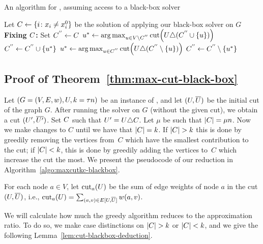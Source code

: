 \begin{algorithm}[H]
\caption{An algorithm for \maxcutkc, assuming access to a black-box \maxcut solver}
\label{algo:maxcutkc-blackbox}
\begin{algorithmic}[1]
\State Let $C \leftarrow \{i \colon x_i \neq x^0_i\}$ be the solution
	of applying our black-box \maxcut solver on $G$
\State \textbf{Fixing $C$:} Set $C^{''} \gets C$ 
        \State $u^* \leftarrow \arg\max_{u \in V \setminus \FixSelectSet} \cut{\OldSet \symm (\FixSelectSet \cup \{u\})}$
        \State $C^{''} \leftarrow C^{''} \cup \{u^*\}$
        \State $u^* \leftarrow \arg\max_{u \in \FixSelectSet} \cut{\OldSet \symm (\FixSelectSet \setminus \{u\})}$
        \State $C^{''} \leftarrow C^{''} \setminus \{u^*\}$
    \EndIf
\EndWhile
\State \Return{$\FixSelectSet$}
\end{algorithmic}
\end{algorithm}

\subsection{Proof of Theorem~\ref{thm:max-cut-black-box}}
\label{appendix:mc-proofs:blackbox}
Let $(G=(V, E, w), U, k = \tau n)$ be an instance of \maxcutkc, and let
$(U, \overline{U})$ be the initial cut of the graph $G$.
After running the \maxcut solver on $G$ (without the given cut), we obtain a cut $(U', \overline{U'})$. 
Set $C$ such that $U' = U \triangle C$. Let $\mu$ be
such that $\lvert C\rvert = \mu n$. 
Now we make changes to $C$ until we have that $\lvert C\rvert=k$. If $\lvert C\rvert>k$ this
is done by greedily removing the vertices from~$C$ which have the smallest
contribution to the cut; if $\lvert C\rvert<k$, this is done by greedily adding the
vertices to~$C$ which increase the cut the most.
We present the pseudocode of our reduction in Algorithm~\ref{algo:maxcutkc-blackbox}. 


For each node $a \in V$, let $\mathrm{cut}_{a}\!\left(U\right)$ be the sum of edge weights of node $a$ in the cut
$(U, \overline{U})$, i.e.,
$\mathrm{cut}_{a}\!\left(U\right) = \sum_{(a, v)\in E[U, \overline{U}]} w(a, v)$. 

We will calculate how much the greedy algorithm reduces to the approximation ratio. To do so, we make case distinctions on $\lvert C\rvert > k$ or $\lvert C\rvert <k$, and we give the following Lemma~\ref{lem:cut-blackbox-deduction}.  

